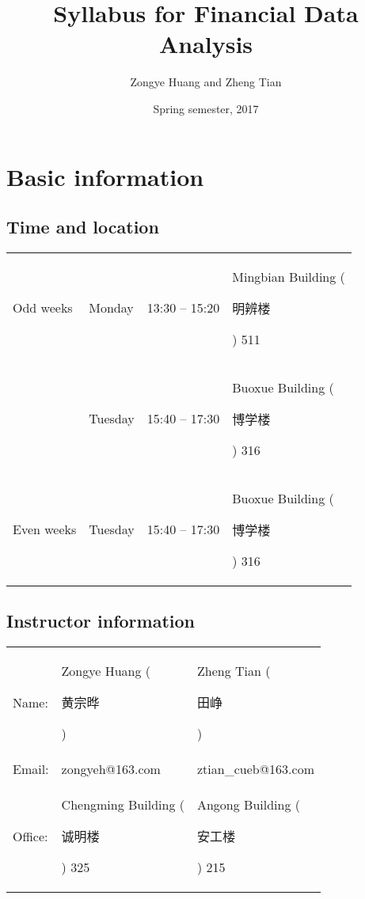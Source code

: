 \documentclass[a4paper,11pt]{article}
\author{Zongye Huang and Zheng Tian}
\date{Spring semester, 2017}
\title{Syllabus for Financial Data Analysis}
\begin{document}
\maketitle

\section{Basic information}
\label{sec:orgd38362b}

\subsection*{Time and location}
\label{sec:org2514c4a}

\begin{center}
\begin{tabular}{llll}
Odd weeks & Monday & 13:30 -- 15:20 & Mingbian Building (\begin{CJK}{UTF8}{gbsn}明辨楼\end{CJK}) 511\\
 & Tuesday & 15:40 -- 17:30 & Buoxue Building (\begin{CJK}{UTF8}{gbsn}博学楼\end{CJK}) 316\\
Even weeks & Tuesday & 15:40 -- 17:30 & Buoxue Building (\begin{CJK}{UTF8}{gbsn}博学楼\end{CJK}) 316\\
\end{tabular}
\end{center}


\subsection*{Instructor information}
\label{sec:orga9bcb3e}

\begin{center}
\begin{tabular}{lll}
Name: & Zongye Huang (\begin{CJK}{UTF8}{gbsn}黄宗晔\end{CJK}) & Zheng Tian (\begin{CJK}{UTF8}{gbsn}田峥\end{CJK})\\
Email: & zongyeh@163.com & ztian\_cueb@163.com\\
Office: & Chengming Building (\begin{CJK}{UTF8}{gbsn}诚明楼\end{CJK}) 325 & Angong Building (\begin{CJK}{UTF8}{gbsn}安工楼\end{CJK}) 215\\
\end{tabular}
\end{center}
\end{document}
